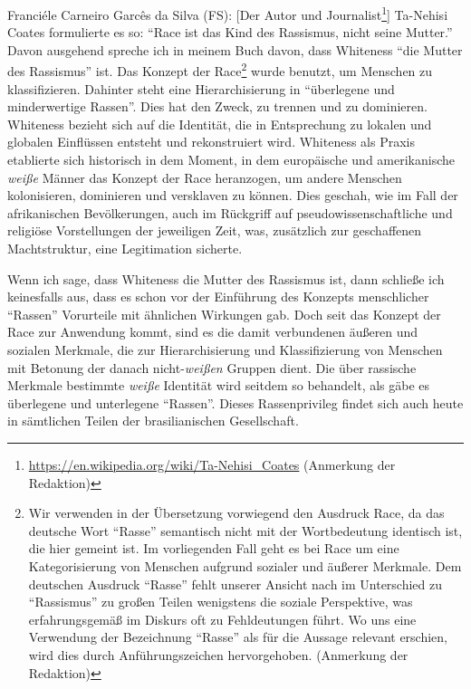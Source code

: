\documentclass[a4paper,
fontsize=11pt,
oneside,
numbers=noperiodatend,
parskip=half-,
bibliography=totoc,
final
]{scrartcl}
\begin{document}
Franciéle Carneiro Garcês da Silva (FS): {[}Der Autor und
Journalist\footnote{\url{https://en.wikipedia.org/wiki/Ta-Nehisi_Coates}
  (Anmerkung der Redaktion)}{]} Ta-Nehisi Coates formulierte es so:
\enquote{Race ist das Kind des Rassismus, nicht seine Mutter.} Davon ausgehend
spreche ich in meinem Buch davon, dass Whiteness \enquote{die Mutter des
Rassismus} ist. Das Konzept der Race\footnote{Wir verwenden in der
  Übersetzung vorwiegend den Ausdruck Race, da das deutsche Wort
  \enquote{Rasse} semantisch nicht mit der Wortbedeutung identisch ist,
  die hier gemeint ist. Im vorliegenden Fall geht es bei Race um eine
  Kategorisierung von Menschen aufgrund sozialer und äußerer Merkmale.
  Dem deutschen Ausdruck \enquote{Rasse} fehlt unserer Ansicht nach im
  Unterschied zu \enquote{Rassismus} zu großen Teilen wenigstens die
  soziale Perspektive, was erfahrungsgemäß im Diskurs oft zu
  Fehldeutungen führt. Wo uns eine Verwendung der Bezeichnung
  \enquote{Rasse} als für die Aussage relevant erschien, wird dies durch
  Anführungszeichen hervorgehoben. (Anmerkung der Redaktion)} wurde
benutzt, um Menschen zu klassifizieren. Dahinter steht eine
Hierarchisierung in \enquote{überlegene und minderwertige Rassen}. Dies hat den
Zweck, zu trennen und zu dominieren. Whiteness bezieht sich auf die
Identität, die in Entsprechung zu lokalen und globalen Einflüssen
entsteht und rekonstruiert wird. Whiteness als Praxis etablierte sich
historisch in dem Moment, in dem europäische und amerikanische
\emph{weiße} Männer das Konzept der Race heranzogen, um andere Menschen
kolonisieren, dominieren und versklaven zu können. Dies geschah, wie im
Fall der afrikanischen Bevölkerungen, auch im Rückgriff auf
pseudowissenschaftliche und religiöse Vorstellungen der jeweiligen Zeit,
was, zusätzlich zur geschaffenen Machtstruktur, eine Legitimation
sicherte.

Wenn ich sage, dass Whiteness die Mutter des Rassismus ist, dann
schließe ich keinesfalls aus, dass es schon vor der Einführung des
Konzepts menschlicher \enquote{Rassen} Vorurteile mit ähnlichen
Wirkungen gab. Doch seit das Konzept der Race zur Anwendung kommt, sind
es die damit verbundenen äußeren und sozialen Merkmale, die zur
Hierarchisierung und Klassifizierung von Menschen mit Betonung der
danach nicht-\emph{weißen} Gruppen dient. Die über rassische Merkmale
bestimmte \emph{weiße} Identität wird seitdem so behandelt, als gäbe es
überlegene und unterlegene \enquote{Rassen}. Dieses Rassenprivileg
findet sich auch heute in sämtlichen Teilen der brasilianischen
Gesellschaft.
\end{document}
